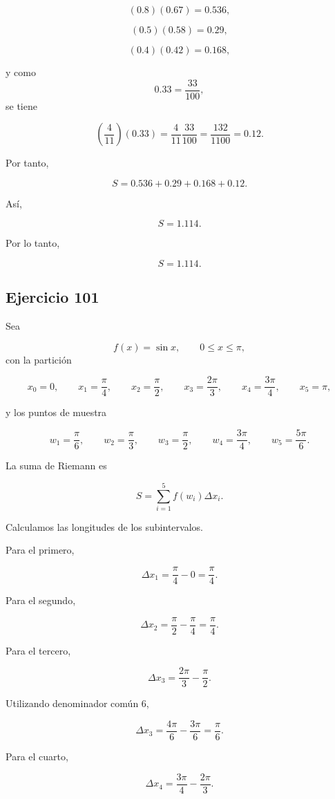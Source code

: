 \documentclass[12pt]{article}
\begin{document}
\[
(0.8)(0.67)=0.536,
\]

\[
(0.5)(0.58)=0.29,
\]

\[
(0.4)(0.42)=0.168,
\]

y como
\[
0.33=\frac{33}{100},
\]
se tiene

\[
\left(\frac4{11}\right)(0.33)
=
\frac4{11}\frac{33}{100}
=
\frac{132}{1100}
=
0.12.
\]

Por tanto,

\[
S
=
0.536+0.29+0.168+0.12.
\]

Así,

\[
S=1.114.
\]

Por lo tanto,

\[
\boxed{
S=1.114
}.
\]

\subsection*{Ejercicio 101}

Sea

\[
f(x)=\sin x,
\qquad
0\leq x\leq\pi,
\]
con la partición

\[
x_0=0,\qquad
x_1=\frac{\pi}{4},\qquad
x_2=\frac{\pi}{2},\qquad
x_3=\frac{2\pi}{3},\qquad
x_4=\frac{3\pi}{4},\qquad
x_5=\pi,
\]

y los puntos de muestra

\[
w_1=\frac{\pi}{6},\qquad
w_2=\frac{\pi}{3},\qquad
w_3=\frac{\pi}{2},\qquad
w_4=\frac{3\pi}{4},\qquad
w_5=\frac{5\pi}{6}.
\]

La suma de Riemann es

\[
S=
\sum_{i=1}^{5}
f(w_i)\Delta x_i.
\]

Calculamos las longitudes de los subintervalos.

Para el primero,

\[
\Delta x_1
=
\frac{\pi}{4}-0
=
\frac{\pi}{4}.
\]

Para el segundo,

\[
\Delta x_2
=
\frac{\pi}{2}-\frac{\pi}{4}
=
\frac{\pi}{4}.
\]

Para el tercero,

\[
\Delta x_3
=
\frac{2\pi}{3}-\frac{\pi}{2}.
\]

Utilizando denominador común \(6\),

\[
\Delta x_3
=
\frac{4\pi}{6}-\frac{3\pi}{6}
=
\frac{\pi}{6}.
\]

Para el cuarto,

\[
\Delta x_4
=
\frac{3\pi}{4}-\frac{2\pi}{3}.
\]
\end{document}
